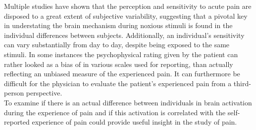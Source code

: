 Multiple studies \cite{Coghill2003,Kim2004,Emerson2014,Davis2017} have shown that the perception and sensitivity to acute pain are disposed to a great extent of subjective variability, suggesting that a pivotal key in understating the brain mechanism during noxious stimuli is found in the individual differences between subjects. Additionally, an individual's sensitivity can vary substantially from day to day, despite being exposed to the same stimuli. In some instances the psychophysical rating given by the patient can rather looked as a bias of in various scales used for reporting, than actually reflecting an unbiased measure of the experienced pain. It can furthermore be difficult for the physician to evaluate the patient's experienced pain from a third-person perspective. \cite{Coghill2003} \\
To examine if there is an actual difference between individuals in brain activation during the experience of pain and if this activation is correlated with the self-reported experience of pain could provide useful insight in the study of pain. \cite{Coghill2003} \\
